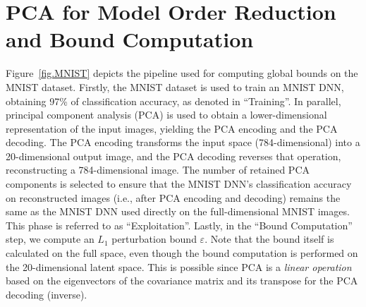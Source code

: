 \section{PCA for Model Order Reduction and Bound Computation}


Figure~\ref{fig.MNIST} depicts the pipeline used for computing global bounds on the MNIST dataset. Firstly, the MNIST dataset is used to train an MNIST DNN, obtaining 97\% of classification accuracy, as denoted in ``Training''. 
%
In parallel, principal component analysis (PCA) is used to obtain a lower-dimensional representation of the input images, yielding the PCA encoding and the PCA decoding. The PCA encoding transforms the input space (784-dimensional) into a 20-dimensional output image, and the PCA decoding reverses that operation, reconstructing a 784-dimensional image. 
%
The number of retained PCA components is selected to ensure that the MNIST DNN's classification accuracy on reconstructed images (i.e., after PCA encoding and decoding) remains the same as the MNIST DNN used directly on the full-dimensional MNIST images. This phase is referred to as ``Exploitation''. 
%
Lastly, in the ``Bound Computation'' step, we compute an $L_1$ perturbation bound $\varepsilon$. Note that the bound itself is calculated on the full space, even though the bound computation is performed on the 20-dimensional latent space. This is possible since PCA is a \emph{linear operation} based on the eigenvectors of the covariance matrix and its transpose for the PCA decoding (inverse).


%
%

